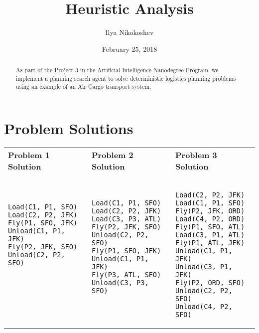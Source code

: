 \documentclass[oneside]{article}   	%
\title{Heuristic Analysis}
\author{Ilya Nikokoshev}
\date{February 25, 2018}
\begin{document}
\maketitle

\begin{abstract}
As part of the Project 3 in the Artificial Intelligence Nanodegree Program, we implement a planning search agent to solve deterministic logistics planning problems using an example of an Air Cargo transport system.
\end{abstract}

\section{Problem Solutions}

\begin{tabular}{lll}

\textbf{Problem 1 Solution} & 
\textbf{Problem 2 Solution} &
\textbf{Problem 3 Solution} \\

\begin{minipage}{2in}
\begin{verbatim}

Load(C1, P1, SFO)
Load(C2, P2, JFK)
Fly(P1, SFO, JFK)
Unload(C1, P1, JFK)
Fly(P2, JFK, SFO)
Unload(C2, P2, SFO)






\end{verbatim}
\end{minipage}

&

\begin{minipage}{2in}
\begin{verbatim}

Load(C1, P1, SFO)
Load(C2, P2, JFK)
Load(C3, P3, ATL)
Fly(P2, JFK, SFO)
Unload(C2, P2, SFO)
Fly(P1, SFO, JFK)
Unload(C1, P1, JFK)
Fly(P3, ATL, SFO)
Unload(C3, P3, SFO)



\end{verbatim}
\end{minipage}

&

\begin{minipage}{2in}
\begin{verbatim}

Load(C2, P2, JFK)
Load(C1, P1, SFO)
Fly(P2, JFK, ORD)
Load(C4, P2, ORD)
Fly(P1, SFO, ATL)
Load(C3, P1, ATL)
Fly(P1, ATL, JFK)
Unload(C1, P1, JFK)
Unload(C3, P1, JFK)
Fly(P2, ORD, SFO)
Unload(C2, P2, SFO)
Unload(C4, P2, SFO)
\end{verbatim}
\end{minipage}

\end{tabular}
\end{document}
